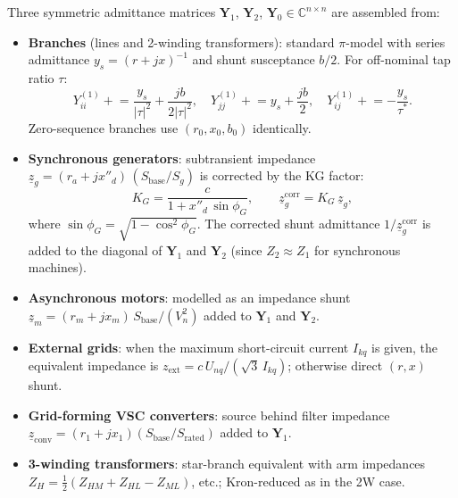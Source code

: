 Three symmetric admittance matrices $\mathbf{Y}_1$, $\mathbf{Y}_2$,
$\mathbf{Y}_0 \in \mathbb{C}^{n\times n}$ are assembled from:
\begin{itemize}
  \item \textbf{Branches} (lines and 2-winding transformers): standard
        $\pi$-model with series admittance $y_s = (r+jx)^{-1}$ and
        shunt susceptance $b/2$.  For off-nominal tap ratio $\tau$:
        \begin{equation}
          Y_{ii}^{(1)} \mathrel{+}= \frac{y_s}{|\tau|^2} + \frac{jb}{2|\tau|^2},
          \quad Y_{jj}^{(1)} \mathrel{+}= y_s + \frac{jb}{2},
          \quad Y_{ij}^{(1)} \mathrel{+}= -\frac{y_s}{\tau^*}.
          \label{eq:sc-ybus-branch}
        \end{equation}
        Zero-sequence branches use $(r_0, x_0, b_0)$ identically.
  \item \textbf{Synchronous generators}: subtransient impedance
        $\underline{z}_g = (r_a + jx''_d)\,(S_{\text{base}}/S_g)$ is
        corrected by the KG factor:
        \begin{equation}
          K_G = \frac{c}{1 + x''_d\,\sin\phi_G},
          \qquad
          \underline{z}_g^{\text{corr}} = K_G\,\underline{z}_g,
          \label{eq:sc-KG}
        \end{equation}
        where $\sin\phi_G = \sqrt{1-\cos^2\!\phi_G}$.
        The corrected shunt admittance $1/\underline{z}_g^{\text{corr}}$
        is added to the diagonal of $\mathbf{Y}_1$ and $\mathbf{Y}_2$
        (since $Z_2 \approx Z_1$ for synchronous machines).
  \item \textbf{Asynchronous motors}: modelled as an impedance shunt
        $\underline{z}_m = (r_m + jx_m)\,S_{\text{base}}/(V_n^2)$ added
        to $\mathbf{Y}_1$ and $\mathbf{Y}_2$.
  \item \textbf{External grids}: when the maximum short-circuit current
        $I_{kq}$ is given, the equivalent impedance is
        $z_{\text{ext}} = c\,U_{nq}/(\sqrt{3}\,I_{kq})$; otherwise
        direct $(r, x)$ shunt.
  \item \textbf{Grid-forming VSC converters}: source behind filter
        impedance $\underline{z}_{\text{conv}} = (r_1 + jx_1)
        (S_{\text{base}}/S_{\text{rated}})$ added to $\mathbf{Y}_1$.
  \item \textbf{3-winding transformers}: star-branch equivalent with
        arm impedances
        $Z_H = \tfrac{1}{2}(Z_{HM}+Z_{HL}-Z_{ML})$, etc.; Kron-reduced
        as in the 2W case.
\end{itemize}

